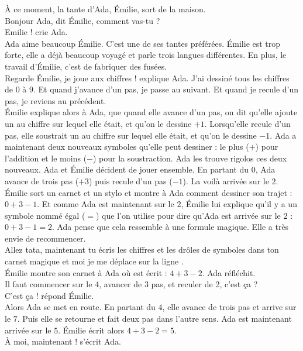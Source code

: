 À ce moment, la tante d'Ada, Émilie, sort de la maison. \\
\guillemotleft Bonjour Ada, dit Émilie, comment vas-tu ?\\
\mdash Emilie !  crie Ada. \guillemotright \\
Ada aime beaucoup Émilie. C’est une de ses tantes préférées. Émilie est trop forte, elle a déjà beaucoup voyagé et parle trois langues différentes. En plus, le travail d’Émilie, c’est de fabriquer des fusées.\\
\guillemotleft Regarde Émilie, je joue aux chiffres ! explique Ada. J’ai dessiné tous les chiffres de 0 à 9. Et quand j’avance d’un pas, je passe au suivant. Et quand je recule d’un pas, je reviens au précédent. \guillemotright \\
Émilie explique alors à Ada, que quand elle avance d’un pas, on dit qu’elle ajoute un au chiffre sur lequel elle était, et qu’on le dessine $+1$. Lorsqu’elle recule d’un pas, elle soustrait un au chiffre sur lequel elle était, et qu’on le dessine $-1$. Ada a maintenant deux nouveaux symboles qu’elle peut dessiner : le plus ($+$) pour l’addition et le moins ($-$) pour la soustraction. Ada les trouve rigolos ces deux nouveaux. 
Ada et Émilie décident de jouer ensemble. En partant du $0$, Ada avance de trois pas ($+3$) puis recule d'un pas ($-1$). La voilà arrivée sur le $2$. Émilie sort un carnet et un stylo et montre à Ada comment dessiner son trajet : $0 + 3 - 1 $. Et comme Ada est maintenant sur le $2$, Émilie lui explique qu’il y a un symbole nommé égal ($=$) que l’on utilise pour dire qu’Ada est arrivée sur le $2$ : $0 + 3 - 1 = 2$. Ada pense que cela ressemble à une formule magique. Elle a très envie de recommencer. \\
\guillemotleft Allez tata, maintenant tu écris les chiffres et les drôles de symboles dans ton carnet magique et moi je me déplace sur la ligne \guillemotright. \\
Émilie montre son carnet à Ada où est écrit : $4 + 3 - 2$. Ada réfléchit. \\
\guillemotleft Il faut commencer sur le 4, avancer de 3 pas, et reculer de 2, c’est ça ? \\
\mdash C’est ça ! répond Émilie. \guillemotright \\
Alors Ada se met en route. En partant du $4$, elle avance de trois pas et arrive sur le $7$. Puis elle se retourne et fait deux pas dans l’autre sens. Ada est maintenant arrivée sur le $5$. Émilie écrit alors $4 + 3 - 2 = 5 $.\\
\guillemotleft À moi, maintenant ! s’écrit Ada. \guillemotright \\
